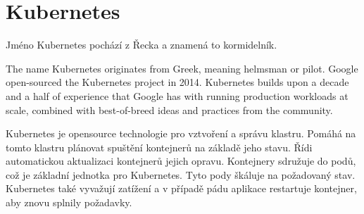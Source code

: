 \section{Kubernetes}

Jméno Kubernetes pochází z Řecka a znamená to kormidelník.

The name Kubernetes originates from Greek, meaning helmsman or pilot. Google open-sourced the Kubernetes project in 2014. Kubernetes builds upon a decade and a half of experience that Google has with running production workloads at scale, combined with best-of-breed ideas and practices from the community.



Kubernetes je opensource technologie pro vztvoření a správu klastru. Pomáhá na tomto klastru plánovat spuštění kontejnerů na základě jeho stavu. Řídi automatickou aktualizaci kontejnerů jejich opravu. Kontejnery sdružuje do podů, což je základní jednotka pro Kubernetes. Tyto pody škáluje na požadovaný stav.
Kubernetes také vyvažují zatížení a v případě pádu aplikace restartuje kontejner, aby znovu splnily požadavky.

